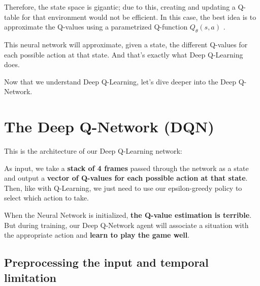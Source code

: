 \documentclass[11pt,a4paper]{article}
\begin{document}

Therefore, the state space is gigantic; due to this, creating and updating a Q-table for that environment would not be efficient. In this case, the best idea is to approximate the Q-values using a parametrized Q-function \(Q_{\theta}(s,a)\) .

This neural network will approximate, given a state, the different Q-values for each possible action at that state. And that's exactly what Deep Q-Learning does.


Now that we understand Deep Q-Learning, let's dive deeper into the Deep Q-Network.

\section{The Deep Q-Network (DQN)}\label{the-deep-q-network-dqn}

This is the architecture of our Deep Q-Learning network:


As input, we take a \textbf{stack of 4 frames} passed through the network as a state and output a \textbf{vector of Q-values for each possible action at that state}. Then, like with Q-Learning, we just need to use our epsilon-greedy policy to select which action to take.

When the Neural Network is initialized, \textbf{the Q-value estimation is terrible}. But during training, our Deep Q-Network agent will associate a situation with the appropriate action and \textbf{learn to play the game well}.

\subsection{Preprocessing the input and temporal limitation}\label{preprocessing-the-input-and-temporal-limitation}
\end{document}
